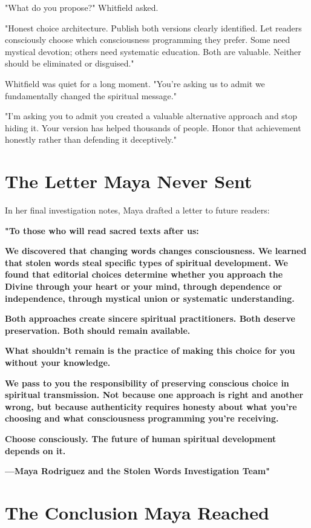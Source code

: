 \documentclass[11pt,twoside]{book}
\begin{document}
"What do you propose?" Whitfield asked.

"Honest choice architecture. Publish both versions clearly identified. Let readers consciously choose which consciousness programming they prefer. Some need mystical devotion; others need systematic education. Both are valuable. Neither should be eliminated or disguised."

Whitfield was quiet for a long moment. "You're asking us to admit we fundamentally changed the spiritual message."

"I'm asking you to admit you created a valuable alternative approach and stop hiding it. Your version has helped thousands of people. Honor that achievement honestly rather than defending it deceptively."
\section*{The Letter Maya Never Sent}
\label{sec:org1b8328c}

In her final investigation notes, Maya drafted a letter to future readers:

\textbf{"To those who will read sacred texts after us:}

\textbf{We discovered that changing words changes consciousness. We learned that stolen words steal specific types of spiritual development. We found that editorial choices determine whether you approach the Divine through your heart or your mind, through dependence or independence, through mystical union or systematic understanding.}

\textbf{Both approaches create sincere spiritual practitioners. Both deserve preservation. Both should remain available.}

\textbf{What shouldn't remain is the practice of making this choice for you without your knowledge.}

\textbf{We pass to you the responsibility of preserving conscious choice in spiritual transmission. Not because one approach is right and another wrong, but because authenticity requires honesty about what you're choosing and what consciousness programming you're receiving.}

\textbf{Choose consciously. The future of human spiritual development depends on it.}

\textbf{—Maya Rodriguez and the Stolen Words Investigation Team"}
\section*{The Conclusion Maya Reached}
\label{sec:orgd126849}
\end{document}
